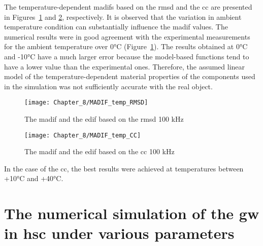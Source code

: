 \documentclass[11pt,a4paper,final]{report}
\theoremstyle{plain}
\begin{document}
The temperature-dependent \acp{madif} based on the \ac{rmsd} and the \ac{cc} are presented in Figures~\ref{fig:madif_temp_rmsd} and \ref{fig:madif_temp_cc}, respectively.
It is observed that the variation in ambient temperature condition can substantially influence the \ac{madif} values.
The numerical results were in good agreement with the experimental measurements for the ambient temperature over 0\unit{\degreeCelsius} (Figure~\ref{fig:madif_temp_rmsd}).
The results obtained at 0\unit{\degreeCelsius} and -10\unit{\degreeCelsius} have a much larger error because the model-based functions tend to have a lower value than the experimental ones.
Therefore, the assumed linear model of the temperature-dependent material properties of the components used in the simulation was not sufficiently accurate with the real object.
\begin{figure}[!tbh]
	\begin{center}
		\texttt{[image: Chapter\_8/MADIF\_temp\_RMSD]}
	\end{center}
	\caption{The \acf{madif} and the \acf{edif} based on the \acf{rmsd} 100 \unit{\kHz}}
	\label{fig:madif_temp_rmsd}
\end{figure}
\begin{figure}
	\begin{center}
		\texttt{[image: Chapter\_8/MADIF\_temp\_CC]}
	\end{center}
	\caption{The \acf{madif} and the \acf{edif} based on the \acf{cc} 100 \unit{\kHz}}
	\label{fig:madif_temp_cc}
\end{figure}
In the case of the \ac{cc}, the best results were achieved at temperatures between +10\unit{\degreeCelsius} and +40\unit{\degreeCelsius}.
\clearpage \section{The numerical simulation of the \acl{gw} in \acl{hsc} under various parameters}
\label{sec:parameters}
\end{document}
